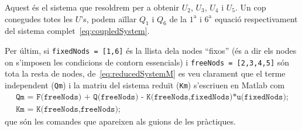 \documentclass[aspectratio=169,xcolor=dvipsnames]{beamer}
\begin{document}
\begin{frame}
  \begin{block}{}\justifying
 Aquest és el sistema que resoldrem per a obtenir $U_{2}$, $U_{3}$, $U_{4}$
 i $U_{5}$. Un cop conegudes totes les $U$'s, podem aïllar $Q_{1}$ i
 $Q_{6}$ de la $1^{\text{a}}$ i $6^{\text{a}}$ equació respectivament del
 sistema complet~\eqref{eq:coupledSystem}.
 \end{block}

 \begin{block}{}\justifying
Per últim, si \texttt{fixedNods = [1,6]} és la llista dela nodes ``fixos''
(és a dir els nodes on s'imposen les condicions de contorn essencials) i
\texttt{freeNods = [2,3,4,5]} són tota la resta de nodes,
de~\eqref{eq:reducedSystemM} es veu clarament que el terme
independent (\texttt{Qm}) i la matriu del sistema reduït (\texttt{Km})
s'escriuen en Matlab com
\begin{displaymath}
\begin{array}{l}
  \texttt{Qm = F(freeNods) + Q(freeNods) -
  K(freeNods,fixedNods)*u(fixedNods);}\\
  \texttt{Km = K(freeNods,freeNods);}
\end{array}
\end{displaymath}
que són les comandes que apareixen als guions de les pràctiques.
\end{block}
\end{frame}
\end{document}
